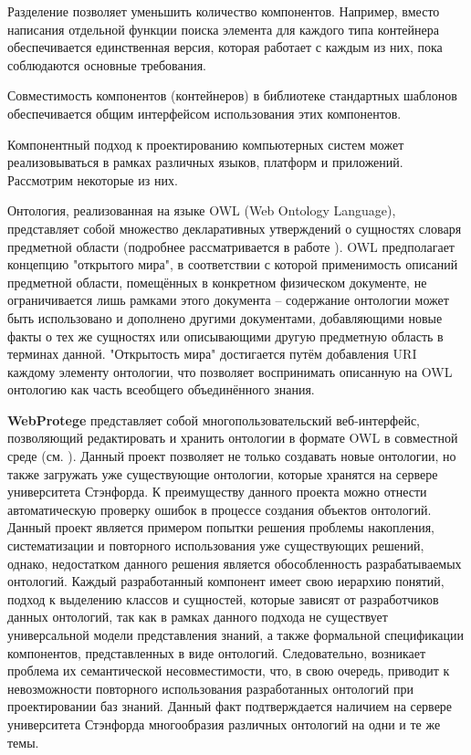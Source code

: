 Разделение позволяет уменьшить количество компонентов. Например, вместо написания отдельной функции поиска элемента для каждого типа контейнера обеспечивается единственная версия, которая работает с каждым из них, пока соблюдаются основные требования.

Совместимость компонентов (контейнеров) в библиотеке стандартных шаблонов обеспечивается общим интерфейсом использования этих компонентов.

Компонентный подход к проектированию компьютерных систем может реализовываться в рамках различных языков, платформ и приложений. Рассмотрим некоторые из них.

Онтология, реализованная на языке OWL (Web Ontology Language), представляет собой множество декларативных утверждений о сущностях словаря предметной области (подробнее рассматривается в работе ). OWL предполагает концепцию "открытого мира"{}, в соответствии с которой применимость описаний предметной области, помещённых в конкретном физическом документе, не ограничивается лишь рамками этого документа – содержание онтологии может быть использовано и дополнено другими документами, добавляющими новые факты о тех же сущностях или описывающими другую предметную область в терминах данной. "Открытость мира"{} достигается путём добавления URI каждому элементу онтологии, что позволяет воспринимать описанную на OWL онтологию как часть всеобщего объединённого знания.

\textbf{WebProtege} представляет собой многопользовательский веб-интерфейс, позволяющий редактировать и хранить онтологии в формате OWL в совместной среде (см. ). Данный проект позволяет не только создавать новые онтологии, но также загружать уже существующие онтологии, которые хранятся на сервере университета Стэнфорда. К преимуществу данного проекта можно отнести автоматическую проверку ошибок в процессе создания объектов онтологий. Данный проект является примером попытки решения проблемы накопления, систематизации и повторного использования уже существующих решений, однако, недостатком данного решения является обособленность разрабатываемых онтологий. Каждый разработанный компонент имеет свою иерархию понятий, подход к выделению классов и сущностей, которые зависят от разработчиков данных онтологий, так как в рамках данного подхода не существует универсальной модели представления знаний, а также формальной спецификации компонентов, представленных в виде онтологий. Следовательно, возникает проблема их семантической несовместимости, что, в свою очередь, приводит к невозможности повторного использования разработанных онтологий при проектировании баз знаний. Данный факт подтверждается наличием на сервере университета Стэнфорда многообразия различных онтологий на одни и те же темы.

